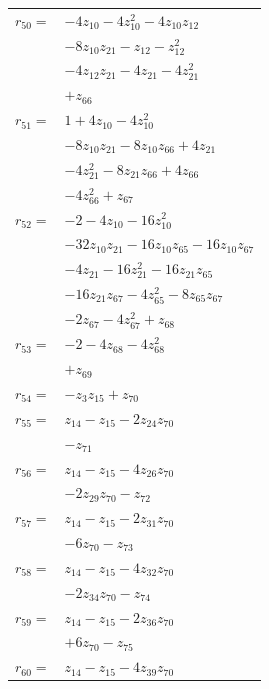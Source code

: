 \begin{longtable}{@{}r@{\;}l@{}}
\(r_{50}=\) & \(\displaystyle -4z_{10} -4z_{10}^{2} -4z_{10}z_{12}\) \\
 & \(\displaystyle -8z_{10}z_{21} -z_{12} -z_{12}^{2}\) \\
 & \(\displaystyle -4z_{12}z_{21} -4z_{21} -4z_{21}^{2}\) \\
 & \(\displaystyle +z_{66}\) \\[3pt]
\(r_{51}=\) & \(\displaystyle 1 +4z_{10} -4z_{10}^{2}\) \\
 & \(\displaystyle -8z_{10}z_{21} -8z_{10}z_{66} +4z_{21}\) \\
 & \(\displaystyle -4z_{21}^{2} -8z_{21}z_{66} +4z_{66}\) \\
 & \(\displaystyle -4z_{66}^{2} +z_{67}\) \\[3pt]
\(r_{52}=\) & \(\displaystyle -2 -4z_{10} -16z_{10}^{2}\) \\
 & \(\displaystyle -32z_{10}z_{21} -16z_{10}z_{65} -16z_{10}z_{67}\) \\
 & \(\displaystyle -4z_{21} -16z_{21}^{2} -16z_{21}z_{65}\) \\
 & \(\displaystyle -16z_{21}z_{67} -4z_{65}^{2} -8z_{65}z_{67}\) \\
 & \(\displaystyle -2z_{67} -4z_{67}^{2} +z_{68}\) \\[3pt]
\(r_{53}=\) & \(\displaystyle -2 -4z_{68} -4z_{68}^{2}\) \\
 & \(\displaystyle +z_{69}\) \\[3pt]
\(r_{54}=\) & \(\displaystyle -z_{3}z_{15} +z_{70}\) \\[3pt]
\(r_{55}=\) & \(\displaystyle z_{14} -z_{15} -2z_{24}z_{70}\) \\
 & \(\displaystyle -z_{71}\) \\[3pt]
\(r_{56}=\) & \(\displaystyle z_{14} -z_{15} -4z_{26}z_{70}\) \\
 & \(\displaystyle -2z_{29}z_{70} -z_{72}\) \\[3pt]
\(r_{57}=\) & \(\displaystyle z_{14} -z_{15} -2z_{31}z_{70}\) \\
 & \(\displaystyle -6z_{70} -z_{73}\) \\[3pt]
\(r_{58}=\) & \(\displaystyle z_{14} -z_{15} -4z_{32}z_{70}\) \\
 & \(\displaystyle -2z_{34}z_{70} -z_{74}\) \\[3pt]
\(r_{59}=\) & \(\displaystyle z_{14} -z_{15} -2z_{36}z_{70}\) \\
 & \(\displaystyle +6z_{70} -z_{75}\) \\[3pt]
\(r_{60}=\) & \(\displaystyle z_{14} -z_{15} -4z_{39}z_{70}\) \\

\end{longtable}
